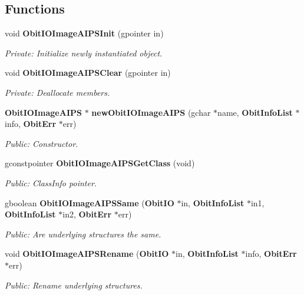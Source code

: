 \subsection*{Functions}
\begin{CompactItemize}
\item 
void {\bf Obit\-IOImage\-AIPSInit} (gpointer in)
\begin{CompactList}\small\item\em Private: Initialize newly instantiated object. \item\end{CompactList}\item 
void {\bf Obit\-IOImage\-AIPSClear} (gpointer in)
\begin{CompactList}\small\item\em Private: Deallocate members. \item\end{CompactList}\item 
{\bf Obit\-IOImage\-AIPS} $\ast$ {\bf new\-Obit\-IOImage\-AIPS} (gchar $\ast$name, {\bf Obit\-Info\-List} $\ast$info, {\bf Obit\-Err} $\ast$err)
\begin{CompactList}\small\item\em Public: Constructor. \item\end{CompactList}\item 
gconstpointer {\bf Obit\-IOImage\-AIPSGet\-Class} (void)
\begin{CompactList}\small\item\em Public: Class\-Info pointer. \item\end{CompactList}\item 
gboolean {\bf Obit\-IOImage\-AIPSSame} ({\bf Obit\-IO} $\ast$in, {\bf Obit\-Info\-List} $\ast$in1, {\bf Obit\-Info\-List} $\ast$in2, {\bf Obit\-Err} $\ast$err)
\begin{CompactList}\small\item\em Public: Are underlying structures the same. \item\end{CompactList}\item 
void {\bf Obit\-IOImage\-AIPSRename} ({\bf Obit\-IO} $\ast$in, {\bf Obit\-Info\-List} $\ast$info, {\bf Obit\-Err} $\ast$err)
\begin{CompactList}\small\item\em Public: Rename underlying structures. \item\end{CompactList}\item 

\end{CompactItemize}
